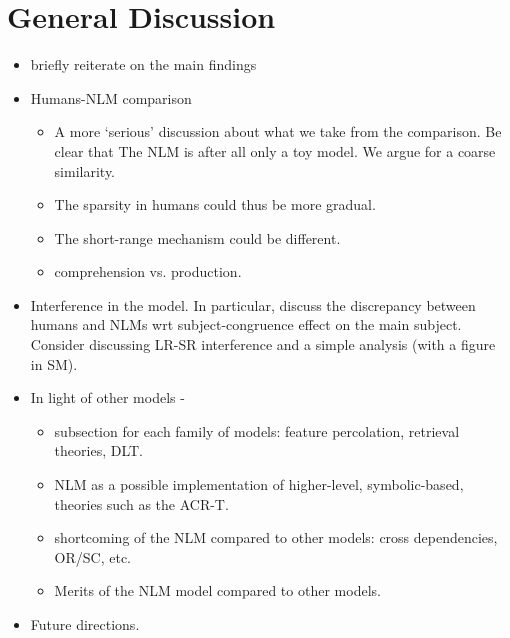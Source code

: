\section{General Discussion}

\begin{itemize}
    \item briefly reiterate on the main findings 
    \item Humans-NLM comparison 
    \begin{itemize}
        \item A more `serious' discussion about what we take from the comparison. Be clear that The NLM is after all only a toy model. We argue for a coarse similarity.
        \item The sparsity in humans could thus be more gradual.   
        \item The short-range mechanism could be different. 
        \item comprehension vs. production.
    \end{itemize}
      
    \item Interference in the model. In particular, discuss the discrepancy between humans and NLMs wrt subject-congruence effect on the main subject. Consider discussing LR-SR interference and a simple analysis (with a figure in SM).
    \item In light of other models -
    \begin{itemize}
        \item subsection for each family of models: feature percolation, retrieval theories, DLT. 
        \item NLM as a possible implementation of higher-level, symbolic-based, theories such as the ACR-T.
        \item shortcoming of the NLM compared to other models: cross dependencies, OR/SC, etc. 
        \item Merits of the NLM model compared to other models.    
    \end{itemize}
    
    \item Future directions. 
    
\end{itemize}
